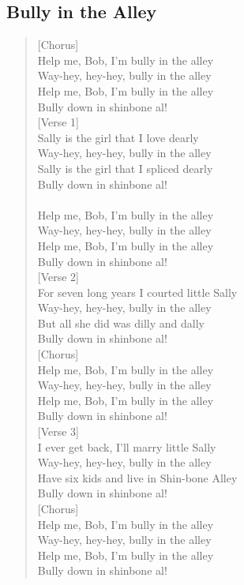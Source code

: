 \documentclass[11pt]{article}
\begin{document}
\subsection{Bully in the Alley}
\label{sec:orgbc5f34b}
\begin{verse}
[Chorus]\\
Help me, Bob, I'm bully in the alley\\
Way-hey, hey-hey, bully in the alley\\
Help me, Bob, I'm bully in the alley\\
Bully down in shinbone al!\\
\vspace*{1em}
[Verse 1]\\
Sally is the girl that I love dearly\\
Way-hey, hey-hey, bully in the alley\\
Sally is the girl that I spliced dearly\\
Bully down in shinbone al!\\
[Chorus]\\
Help me, Bob, I'm bully in the alley\\
Way-hey, hey-hey, bully in the alley\\
Help me, Bob, I'm bully in the alley\\
Bully down in shinbone al!\\
\vspace*{1em}
[Verse 2]\\
For seven long years I courted little Sally\\
Way-hey, hey-hey, bully in the alley\\
But all she did was dilly and dally\\
Bully down in shinbone al!\\
\vspace*{1em}
[Chorus]\\
Help me, Bob, I'm bully in the alley\\
Way-hey, hey-hey, bully in the alley\\
Help me, Bob, I'm bully in the alley\\
Bully down in shinbone al!\\
\vspace*{1em}
[Verse 3]\\
I ever get back, I'll marry little Sally\\
Way-hey, hey-hey, bully in the alley\\
Have six kids and live in Shin-bone Alley\\
Bully down in shinbone al!\\
\vspace*{1em}
[Chorus]\\
Help me, Bob, I'm bully in the alley\\
Way-hey, hey-hey, bully in the alley\\
Help me, Bob, I'm bully in the alley\\
Bully down in shinbone al!\\
\end{verse}
\clearpage
\end{document}
